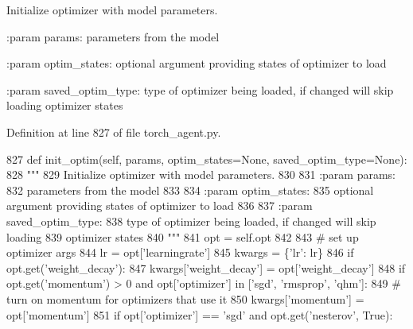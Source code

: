 \begin{DoxyVerb}Initialize optimizer with model parameters.

:param params:
    parameters from the model

:param optim_states:
    optional argument providing states of optimizer to load

:param saved_optim_type:
    type of optimizer being loaded, if changed will skip loading
    optimizer states
\end{DoxyVerb}
 

Definition at line 827 of file torch\+\_\+agent.\+py.


\begin{DoxyCode}
827     \textcolor{keyword}{def }init\_optim(self, params, optim\_states=None, saved\_optim\_type=None):
828         \textcolor{stringliteral}{"""}
829 \textcolor{stringliteral}{        Initialize optimizer with model parameters.}
830 \textcolor{stringliteral}{}
831 \textcolor{stringliteral}{        :param params:}
832 \textcolor{stringliteral}{            parameters from the model}
833 \textcolor{stringliteral}{}
834 \textcolor{stringliteral}{        :param optim\_states:}
835 \textcolor{stringliteral}{            optional argument providing states of optimizer to load}
836 \textcolor{stringliteral}{}
837 \textcolor{stringliteral}{        :param saved\_optim\_type:}
838 \textcolor{stringliteral}{            type of optimizer being loaded, if changed will skip loading}
839 \textcolor{stringliteral}{            optimizer states}
840 \textcolor{stringliteral}{        """}
841         opt = self.opt
842 
843         \textcolor{comment}{# set up optimizer args}
844         lr = opt[\textcolor{stringliteral}{'learningrate'}]
845         kwargs = \{\textcolor{stringliteral}{'lr'}: lr\}
846         \textcolor{keywordflow}{if} opt.get(\textcolor{stringliteral}{'weight\_decay'}):
847             kwargs[\textcolor{stringliteral}{'weight\_decay'}] = opt[\textcolor{stringliteral}{'weight\_decay'}]
848         \textcolor{keywordflow}{if} opt.get(\textcolor{stringliteral}{'momentum'}) > 0 \textcolor{keywordflow}{and} opt[\textcolor{stringliteral}{'optimizer'}] \textcolor{keywordflow}{in} [\textcolor{stringliteral}{'sgd'}, \textcolor{stringliteral}{'rmsprop'}, \textcolor{stringliteral}{'qhm'}]:
849             \textcolor{comment}{# turn on momentum for optimizers that use it}
850             kwargs[\textcolor{stringliteral}{'momentum'}] = opt[\textcolor{stringliteral}{'momentum'}]
851             \textcolor{keywordflow}{if} opt[\textcolor{stringliteral}{'optimizer'}] == \textcolor{stringliteral}{'sgd'} \textcolor{keywordflow}{and} opt.get(\textcolor{stringliteral}{'nesterov'}, \textcolor{keyword}{True}):

\end{DoxyCode}
